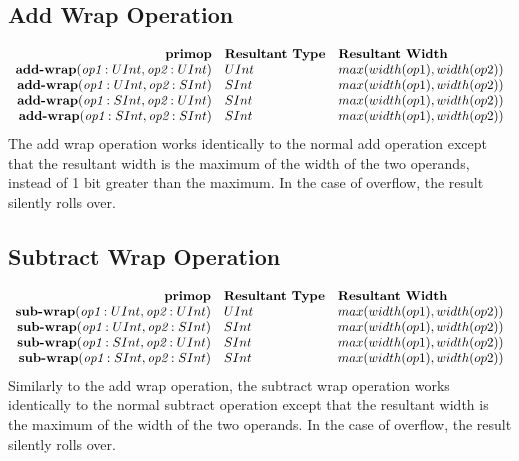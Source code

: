 \documentclass[12pt]{article}
\begin{document}
\subsection{Add Wrap Operation}
\[
\begin{array}{rll}
\text{\bf primop} & \text{\bf Resultant Type} & \text{\bf Resultant Width} \\
\text{\bf add-wrap}(\text{\em op1}:UInt, \text{\em op2}:UInt) & UInt & max(width(op1),width(op2)) \\
\text{\bf add-wrap}(\text{\em op1}:UInt, \text{\em op2}:SInt) & SInt & max(width(op1),width(op2)) \\
\text{\bf add-wrap}(\text{\em op1}:SInt, \text{\em op2}:UInt) & SInt & max(width(op1),width(op2)) \\
\text{\bf add-wrap}(\text{\em op1}:SInt, \text{\em op2}:SInt) & SInt & max(width(op1),width(op2)) \\
\end{array}
\]
The add wrap operation works identically to the normal add operation except that the resultant width is the maximum of the width of the two operands, instead of 1 bit greater than the maximum.
In the case of overflow, the result silently rolls over.

\subsection{Subtract Wrap Operation}
\[
\begin{array}{rll}
\text{\bf primop} & \text{\bf Resultant Type} & \text{\bf Resultant Width} \\
\text{\bf sub-wrap}(\text{\em op1}:UInt, \text{\em op2}:UInt) & UInt & max(width(op1),width(op2)) \\
\text{\bf sub-wrap}(\text{\em op1}:UInt, \text{\em op2}:SInt) & SInt & max(width(op1),width(op2)) \\
\text{\bf sub-wrap}(\text{\em op1}:SInt, \text{\em op2}:UInt) & SInt & max(width(op1),width(op2)) \\
\text{\bf sub-wrap}(\text{\em op1}:SInt, \text{\em op2}:SInt) & SInt & max(width(op1),width(op2)) \\
\end{array}
\]
Similarly to the add wrap operation, the subtract wrap operation works identically to the normal subtract operation except that the resultant width is the maximum of the width of the two operands.
In the case of overflow, the result silently rolls over.
\end{document}
